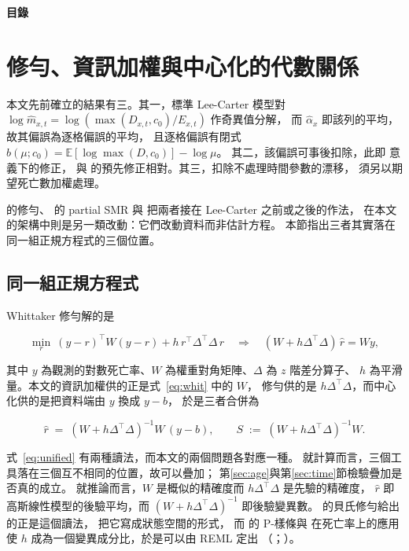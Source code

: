 \documentclass[UTF8, fontset=macnew, a4paper, 12pt]{ctexart}
\newcommand{\Ex}{\mathbb{E}}
\begin{document}
\clearpage
{\bfseries 目\quad 錄}\par\vspace{8pt}
\makeatletter{}\makeatother

\clearpage
{}

\section{修勻、資訊加權與中心化的代數關係}\label{sec:algebra}

本文先前確立的結果有三。其一，標準 Lee-Carter 模型對
$\log\hat m_{x,t}=\log(\max(D_{x,t},c_0)/E_{x,t})$ 作奇異值分解，
而 $\hat\alpha_x$ 即該列的平均，故其偏誤為逐格偏誤的平均，
且逐格偏誤有閉式 $b(\mu;c_0)=\Ex[\log\max(D,c_0)]-\log\mu$。
其二，該偏誤可事後扣除，此即 \citet{coxsnell1968} 意義下的修正，
與 \citet{firth1993} 的預先修正相對。其三，扣除不處理時間參數的漂移，
須另以期望死亡數加權處理。

\citet{whittaker1923} 的修勻、\citet{lee2003} 的 partial SMR 與
\citet{yue2019} 把兩者接在 Lee-Carter 之前或之後的作法，
在本文的架構中則是另一類改動：它們改動資料而非估計方程。
本節指出三者其實落在同一組正規方程式的三個位置。

\subsection{同一組正規方程式}\label{subsec:one}

Whittaker 修勻解的是

\begin{equation}\label{eq:whit}
\min_r \ (y-r)^{\top} W (y-r) + h\, r^{\top}\Delta^{\top}\!\Delta\, r
\quad\Longrightarrow\quad
(W + h\Delta^{\top}\!\Delta)\,\hat r = W y ,
\end{equation}

其中 $y$ 為觀測的對數死亡率、$W$ 為權重對角矩陣、$\Delta$ 為 $z$ 階差分算子、
$h$ 為平滑量。本文的資訊加權供的正是式~\eqref{eq:whit} 中的 $W$，
修勻供的是 $h\Delta^{\top}\!\Delta$，而中心化供的是把資料端由 $y$ 換成 $y-b$，
於是三者合併為

\begin{equation}\label{eq:unified}
\hat r \;=\; (W + h\Delta^{\top}\!\Delta)^{-1} W\,(y-b),
\qquad S \;:=\; (W + h\Delta^{\top}\!\Delta)^{-1} W .
\end{equation}

式~\eqref{eq:unified} 有兩種讀法，而本文的兩個問題各對應一種。
就計算而言，三個工具落在三個互不相同的位置，故可以疊加；
第\ref{sec:age}與第\ref{sec:time}節檢驗疊加是否真的成立。
就推論而言，$W$ 是概似的精確度而 $h\Delta^{\top}\!\Delta$ 是先驗的精確度，
$\hat r$ 即高斯線性模型的後驗平均，而 $(W+h\Delta^{\top}\!\Delta)^{-1}$ 即後驗變異數。
\citet{kimeldorf1967} 的貝氏修勻給出的正是這個讀法，
\citet{verrall1993} 把它寫成狀態空間的形式，
而 \citet{eilers1996} 的 P-樣條與 \citet{currie2004} 在死亡率上的應用
使 $h$ 成為一個變異成分比，於是可以由 REML 定出
（\citealp{ruppert2003}；\citealp{langbrezger2004}）。
\end{document}
